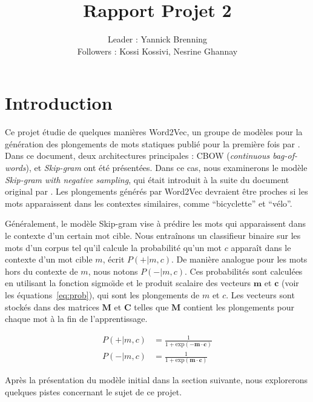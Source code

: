 \documentclass[12pt]{article}
\title{Rapport Projet 2}
\author{Leader : Yannick Brenning \\ Followers : Kossi Kossivi, Nesrine Ghannay}
\begin{document}
\maketitle

\vspace{0.5in}

\section{Introduction} \label{introduction}

Ce projet étudie de quelques manières Word2Vec, un groupe de modèles pour la génération des plongements de mots statiques publié pour la première fois par \cite{DBLP:journals/corr/abs-1301-3781}. Dans ce document, deux architectures principales : CBOW (\textit{continuous bag-of-words}), et \textit{Skip-gram} ont été présentées. Dans ce cas, nous examinerons le modèle \textit{Skip-gram with negative sampling}, qui était introduit à la suite du document original par \cite{DBLP:conf/nips/MikolovSCCD13}. Les plongements générés par Word2Vec devraient être proches si les mots apparaissent dans les contextes similaires, comme ``bicyclette'' et ``vélo''.

Généralement, le modèle Skip-gram vise à prédire les mots qui apparaissent dans le contexte d'un certain mot cible. Nous entraînons un classifieur binaire sur les mots d'un corpus tel qu'il calcule la probabilité qu'un mot $c$ apparaît dans le contexte d'un mot cible $m$, écrit $P(+|m, c)$. De manière analogue pour les mots hors du contexte de $m$, nous notons $P(-|m, c)$. Ces probabilités sont calculées en utilisant la fonction sigmo\"\i de et le produit scalaire des vecteurs $\mathbf{m} $ et $ \mathbf{c} $ (voir les équations~\ref{eq:prob}), qui sont les plongements de $m$ et $c$. Les vecteurs sont stockés dans des matrices $\mathbf{M}$ et $\mathbf{C}$ telles que $\mathbf{M}$ contient les plongements pour chaque mot à la fin de l'apprentissage.

\begin{equation}\label{eq:prob}
\begin{split}
    P(+|m, c) & = \frac{1}{1 + \text{exp}(-\mathbf{m} \cdot \mathbf{c})} \\
    P(-|m, c) & = \frac{1}{1 + \text{exp}(\mathbf{m} \cdot \mathbf{c})} 
\end{split}
\end{equation}

Après la présentation du modèle initial dans la section suivante, nous explorerons quelques pistes concernant le sujet de ce projet.
\end{document}
